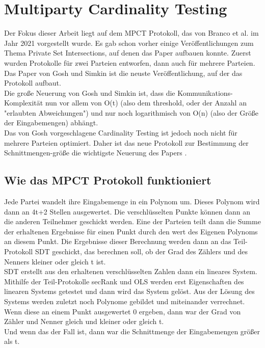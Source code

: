 \chapter{Multiparty Cardinality Testing}

Der Fokus dieser Arbeit liegt auf dem MPCT Protokoll, das von Branco et al. im Jahr 2021 \cite{Doettling2021} vorgestellt wurde. Es gab schon vorher einige Veröffentlichungen zum Thema Private Set Intersections, auf denen das Paper aufbauen konnte. Zuerst wurden Protokolle für zwei Parteien entworfen, dann auch für mehrere Parteien. Das Paper von Gosh und Simkin \cite{Ghosh2019} ist die neuste Veröffentlichung, auf der das Protokoll aufbaut.\\
Die große Neuerung von Gosh und Simkin ist, dass die Kommunikations-Komplexität nun vor allem von O(t) (also dem threshold, oder der Anzahl an "erlaubten Abweichungen") und nur noch logarithmisch von O(n) (also der Größe der Eingabemengen) abhängt. \cite{Ghosh2019}\\
Das von Gosh vorgeschlagene Cardinality Testing ist jedoch noch nicht  für mehrere Parteien optimiert. Daher ist das neue Protokoll zur Bestimmung der Schnittmengen-größe die wichtigste Neuerung des Papers \cite{Doettling2021}.

\section{Wie das MPCT Protokoll funktioniert}
Jede Partei wandelt ihre Eingabemenge in ein Polynom um. Dieses Polynom wird dann an 4t+2 Stellen ausgewertet. Die verschlüsselten Punkte können dann an die anderen Teilnehmer geschickt werden. Eine der Parteien teilt dann die Summe der erhaltenen Ergebnisse für einen Punkt durch den wert des Eigenen Polynoms an diesem Punkt.
Die Ergebnisse dieser Berechnung werden dann an das Teil-Protokoll SDT geschickt, das berechnen soll, ob der Grad des Zählers und des Nenners kleiner oder gleich t ist.\\
SDT erstellt aus den erhaltenen verschlüsselten Zahlen dann ein lineares System. Mithilfe der Teil-Protokolle secRank und OLS werden erst Eigenschaften des linearen Systems getestet und dann wird das System gelöst. Aus der Lösung des Systems werden zuletzt noch Polynome gebildet und miteinander verrechnet. Wenn diese an einem Punkt ausgewertet 0 ergeben, dann war der Grad von Zähler und Nenner gleich und kleiner oder gleich t.\\
Und wenn das der Fall ist, dann war die Schnittmenge der Eingabemengen größer als t.


